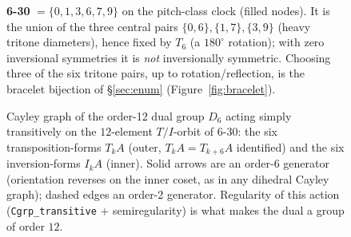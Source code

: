 \documentclass[11pt]{article}
\newcommand{\lean}[1]{\texttt{#1}}
\newcommand{\Dgrp}[1]{D_{#1}}
\begin{document}
\begin{figure}[h]
\centering
{}
\caption{\textbf{6-30} $=\{0,1,3,6,7,9\}$ on the pitch-class clock (filled nodes). It is the union of
the three central pairs $\{0,6\},\{1,7\},\{3,9\}$ (heavy tritone diameters), hence fixed by $T_6$ (a
$180^\circ$ rotation); with zero inversional symmetries it is \emph{not} inversionally symmetric. Choosing
three of the six tritone pairs, up to rotation/reflection, is the bracelet bijection of
\S\ref{sec:enum} (Figure~\ref{fig:bracelet}).}
\label{fig:clock}
\end{figure}

\begin{figure}[h]
\centering
{}
\caption{Cayley graph of the order-12 dual group $\Dgrp{6}$ acting simply transitively on the
$12$-element $T/I$-orbit of 6-30: the six transposition-forms $T_kA$ (outer, $T_kA=T_{k+6}A$ identified)
and the six inversion-forms $I_kA$ (inner). Solid arrows are an order-6 generator (orientation reverses
on the inner coset, as in any dihedral Cayley graph); dashed edges an order-2 generator. Regularity of
this action (\lean{Cgrp\_transitive} + semiregularity) is what makes the dual a group of order $12$.}
\label{fig:cayley}
\end{figure}
\end{document}
